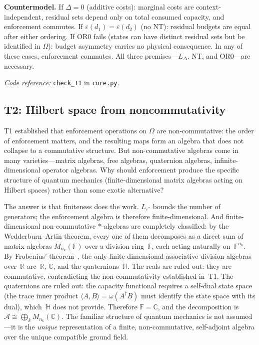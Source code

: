 \documentclass[11pt]{article}
\newcommand{\coderef}[2]{\smallskip\noindent\textit{Code reference:} \texttt{#1} in \texttt{#2}.}
\begin{document}
\begin{tcolorbox}[apfbox, title={Theorem T1 --- The Bridge Theorem (Order-Dependence)}]
\smallskip\noindent\textbf{Countermodel.}  If $\Delta = 0$ (additive costs): marginal costs are context-independent, residual sets depend only on total consumed capacity, and enforcement commutes.  If $\varepsilon(d_1) = \varepsilon(d_2)$ (no NT): residual budgets are equal after either ordering.  If OR0 fails (states can have distinct residual sets but be identified in $\Omega$): budget asymmetry carries no physical consequence.  In any of these cases, enforcement commutes.  All three premises---$L_\Delta$, NT, and OR0---are necessary.

\coderef{check\_T1}{core.py}
\end{tcolorbox}


\subsection{T2: Hilbert space from noncommutativity}

T1 established that enforcement operations on $\Omega$ are non-commutative: the order of enforcement matters, and the resulting maps form an algebra that does not collapse to a commutative structure.  But non-commutative algebras come in many varieties---matrix algebras, free algebras, quaternion algebras, infinite-dimensional operator algebras.  Why should enforcement produce the specific structure of quantum mechanics (finite-dimensional matrix algebras acting on Hilbert spaces) rather than some exotic alternative?

The answer is that finiteness does the work.  $L_{\varepsilon^*}$ bounds the number of generators; the enforcement algebra is therefore finite-dimensional.  And finite-dimensional non-commutative $*$-algebras are completely classified: by the Wedderburn--Artin theorem, every one of them decomposes as a direct sum of matrix algebras $M_{n_k}(\mathbb{F})$ over a division ring~$\mathbb{F}$, each acting naturally on~$\mathbb{F}^{n_k}$.  By Frobenius' theorem~\cite{Frobenius1878}, the only finite-dimensional associative division algebras over~$\mathbb{R}$ are~$\mathbb{R}$, $\mathbb{C}$, and the quaternions~$\mathbb{H}$.  The reals are ruled out: they are commutative, contradicting the non-commutativity established in~T1.  The quaternions are ruled out: the capacity functional requires a self-dual state space (the trace inner product $\langle A, B\rangle = \omega(A^\dagger B)$ must identify the state space with its dual), which~$\mathbb{H}$ does not provide.  Therefore $\mathbb{F} = \mathbb{C}$, and the decomposition is $\mathcal{A} \cong \bigoplus_k M_{n_k}(\mathbb{C})$.  The familiar structure of quantum mechanics is not assumed---it is the \emph{unique} representation of a finite, non-commutative, self-adjoint algebra over the unique compatible ground field.
\end{document}
